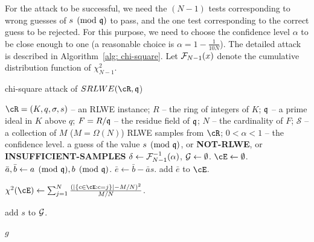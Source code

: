 \documentclass[envcountsect]{llncs}
\begin{document}
For the attack to be successful, we need the $(N-1)$ tests corresponding to wrong guesses of $s \pmod{\mathfrak{q}}$ to pass, and the one test corresponding to the correct guess to be rejected. For this purpose, we need to choose the confidence level $\alpha$ to be close enough to one (a reasonable choice is $\alpha = 1 - \frac{1}{10N}$). The detailed attack is described in Algorithm~\ref{alg: chi-square}.  Let $\mathcal{F}_{N-1}(x)$ denote the cumulative distribution function of $\chi_{N-1}^2$. 



\begin{algorithm}
\caption{chi-square attack of $SRLWE(\cR,\fq$)}    
 \label{alg: chi-square}        %
\begin{algorithmic} %
    \Require  $\cR = (K,q,\sigma, s)$ -- an RLWE instance; $R$ -- the ring of integers of $K$; $\mathfrak{q}$ -- a prime ideal in $K$ above $q$; $F = R/\mathfrak{q}$ -- the residue field of $\mathfrak{q}$; $N$ -- the cardinality of $F$; $\mathcal{S}$ -- a collection of $M$ ($M = \Omega(N)$) RLWE samples from $\cR$; $0 < \alpha < 1$ -- the confidence level. 
    \Ensure a guess of the value $s \pmod{\mathfrak{q}}$, or {\bf NOT-RLWE}, or {\bf INSUFFICIENT-SAMPLES}
    \State $\delta \gets \mathcal{F}_{N-1}^{-1}(\alpha)$, $\mathcal{G} \gets \emptyset$.
        \State $\cE \gets \emptyset$.
            \State $\bar{a}, \bar{b} \gets a \pmod{\mathfrak{q}}, b \pmod{\mathfrak{q}}$.
            \State $\bar{e} \gets \bar{b} - \bar{a}s$.
            \State add $\bar{e}$ to $\cE$.
        \EndFor

        \State     $\chi^2(\cE) \gets \sum_{j = 1}^N \frac{(|\{c \in \cE: c = j\}|  - M/N)^2}{M/N}$.

            \State add $s$ to $\mathcal{G}$.
        \EndIf
    \EndFor


        \Return $g$
    \Else
    
    \EndIf

\end{algorithmic}
\end{algorithm}
\end{document}
